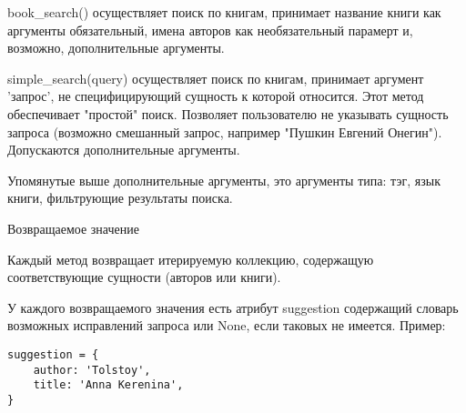 book\_search() осуществляет поиск по книгам, принимает название книги как аргументы обязательный, имена авторов как необязательный парамерт и, возможно, дополнительные аргументы. 

simple\_search(query) осуществляет поиск по книгам, принимает аргумент 'запрос', не специфицирующий сущность к которой относится.
Этот метод обеспечивает "простой" поиск.
Позволяет пользователю не указывать сущность запроса (возможно смешанный запрос, например "Пушкин Евгений Онегин"). Допускаются дополнительные аргументы. 

Упомянутые выше дополнительные аргументы, это аргументы типа: тэг, язык книги, фильтрующие результаты поиска. 


Возвращаемое значение

Каждый метод возвращает итерируемую коллекцию, содержащую соответствующие сущности (авторов или книги). 

У каждого возвращаемого значения есть атрибут suggestion содержащий словарь возможных исправлений запроса или None, если таковых не имеется. Пример: 
\begin{verbatim}
suggestion = {
    author: 'Tolstoy',
    title: 'Anna Kerenina',
}
\end{verbatim}
